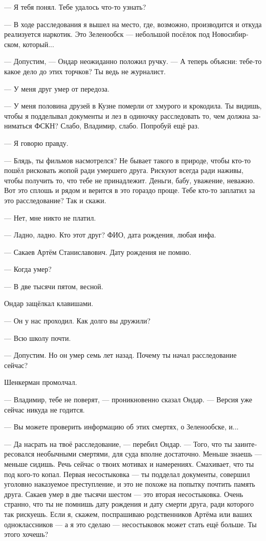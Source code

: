 \documentclass[a5paper,12pt,fleqn]{extbook}\usepackage{cooltooltips}\usepackage{polyglossia}\setdefaultlanguage[babelshorthands=true]{russian}\setotherlanguage{english}\defaultfontfeatures{Ligatures=TeX,Mapping=tex-text} \usepackage{xcolor}\definecolor{lightgray}{HTML}{bbbbbb}\color{lightgray}\newcommand{\ml}[3]{\textenglish{\textcolor{black}{#3}}}
\begin{document}
--- Я тебя понял.
Тебе удалось что-то узнать?

--- В ходе расследования я вышел на место, где, возможно, производится и откуда реализуется наркотик.
Это Зеленообск --- небольшой посёлок под Новосибирском, который...

--- Допустим, --- Ондар неожиданно положил ручку.
--- А теперь объясни: тебе-то какое дело до этих торчков?
Ты ведь не журналист.

--- У меня друг умер от передоза.

--- У меня половина друзей в Кузне померли от хмурого и крокодила.
Ты видишь, чтобы я подделывал документы и лез в одиночку расследовать то, чем должна заниматься ФСКН?
Слабо, Владимир, слабо.
Попробуй ещё раз.

--- Я говорю правду.

--- Блядь, ты фильмов насмотрелся?
Не бывает такого в природе, чтобы кто-то пошёл рисковать жопой ради умершего друга.
Рискуют всегда ради наживы, чтобы получить то, что тебе не принадлежит.
Деньги, бабу, уважение, неважно.
Вот это сплошь и рядом и верится в это гораздо проще.
Тебе кто-то заплатил за это расследование?
Так и скажи.

--- Нет, мне никто не платил.

--- Ладно, ладно.
Кто этот друг?
ФИО, дата рождения, любая инфа.

--- Сакаев Артём Станиславович.
Дату рождения не помню.

--- Когда умер?

--- В две тысячи пятом, весной.

Ондар защёлкал клавишами.

--- Он у нас проходил.
Как долго вы дружили?

--- Всю школу почти.

--- Допустим.
Но он умер семь лет назад.
Почему ты начал расследование сейчас?

Шенкерман промолчал.

--- Владимир, тебе не поверят, --- проникновенно сказал Ондар.
--- Версия уже сейчас никуда не годится.

--- Вы можете проверить информацию об этих смертях, о Зеленообске, и...

--- Да насрать на твоё расследование, --- перебил Ондар.
--- Того, что ты заинтересовался необычными смертями, для суда вполне достаточно.
Меньше знаешь --- меньше сидишь.
Речь сейчас о твоих мотивах и намерениях.
Смахивает, что ты под кого-то копал.
Первая несостыковка --- ты подделал документы, совершил уголовно наказуемое преступление, и это не похоже на попытку почтить память друга.
Сакаев умер в две тысячи шестом --- это вторая несостыковка.
Очень странно, что ты не помнишь дату рождения и дату смерти друга, ради которого так рискуешь.
Если я, скажем, поспрашиваю родственников Артёма или ваших одноклассников --- а я это сделаю --- несостыковок может стать ещё больше.
Ты этого хочешь?
\end{document}
